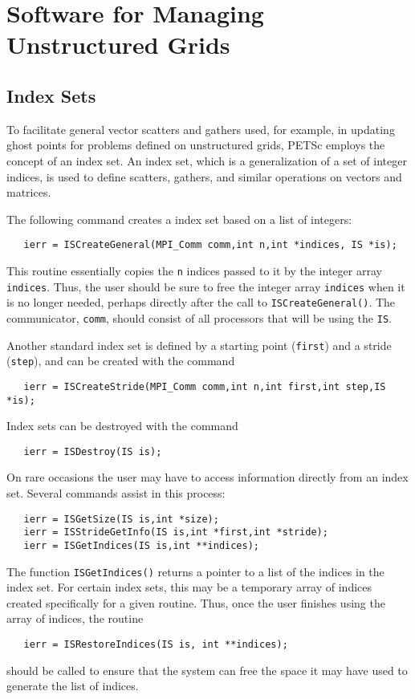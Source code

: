\section{Software for Managing Unstructured Grids}
\label{sec:unstruct}

\subsection{Index Sets} 
\label{sec:indexset}

To facilitate general vector scatters and gathers used, for example, in updating 
ghost points for problems defined on unstructured grids, PETSc employs the 
concept of an index set.  An index set, which is a generalization of a 
set of integer indices, is used to define scatters, gathers, and similar 
operations on vectors and matrices. 

The following command creates a index set based on a list 
of integers: 
\begin{verbatim}
   ierr = ISCreateGeneral(MPI_Comm comm,int n,int *indices, IS *is);
\end{verbatim}
This routine essentially copies the {\tt n} indices passed 
to it by the integer array {\tt indices}.  
Thus, the user should be sure to free the integer array {\tt indices} 
when it is no longer needed, perhaps directly after the call to 
{\tt ISCreateGeneral()}. The communicator, {\tt comm}, should consist of all 
processors that will be using the {\tt IS}.

Another standard index set is defined by a starting point ({\tt first}) and a
stride ({\tt step}),  and can be created with the command
\begin{verbatim}
   ierr = ISCreateStride(MPI_Comm comm,int n,int first,int step,IS *is);
\end{verbatim}

Index sets can be destroyed with the command 
\begin{verbatim}
   ierr = ISDestroy(IS is); 
\end{verbatim}

On rare occasions the user may have to access information directly 
from an index set.  
Several commands  
assist in this process:
\begin{verbatim}
   ierr = ISGetSize(IS is,int *size);
   ierr = ISStrideGetInfo(IS is,int *first,int *stride);
   ierr = ISGetIndices(IS is,int **indices);
\end{verbatim}
The function {\tt ISGetIndices()} returns a pointer to a list of the 
indices in the index set. 
For certain index sets, this may be a 
temporary array of indices created specifically for a given routine. 
Thus, once the user finishes using the array of indices, 
the routine 
\begin{verbatim}
   ierr = ISRestoreIndices(IS is, int **indices); 
\end{verbatim}
should be called to ensure that the system can free the space it 
may have used to generate the list of indices.

